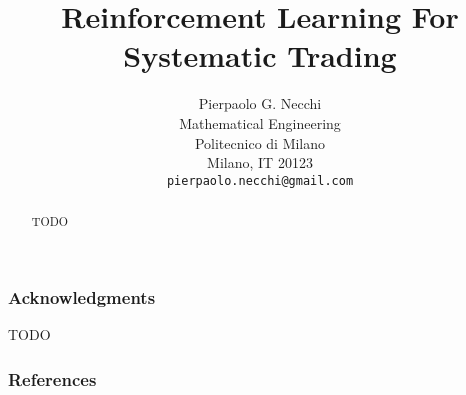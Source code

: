 \documentclass{article} %
\title{Reinforcement Learning For Systematic Trading}
\author{%
Pierpaolo G. Necchi\\
Mathematical Engineering\\
Politecnico di Milano\\
Milano, IT 20123 \\
\texttt{pierpaolo.necchi@gmail.com}
}
\begin{document}
\maketitle

\begin{abstract}
TODO
\end{abstract}


\clearpage










\subsubsection*{Acknowledgments}

TODO

\subsubsection*{References}




\end{document}
